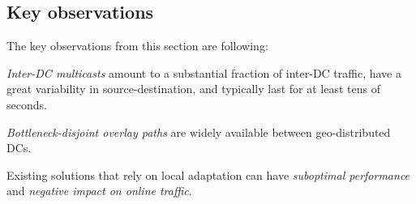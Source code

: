 \subsection{Key observations}
The key observations from this section are following:
\begin{packeditemize}
\item {\em Inter-DC multicasts} amount to a substantial fraction of
inter-DC traffic, have a great variability in source-destination, and
typically last for at least tens of seconds.
\item {\em Bottleneck-disjoint overlay paths} are widely available
between geo-distributed DCs.
\item Existing solutions that rely on local adaptation can have
{\em suboptimal performance} and {\em negative impact on
online traffic}.
\end{packeditemize}




